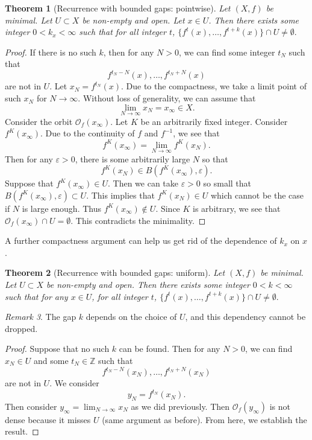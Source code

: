 \documentclass[12pt]{article}
\newtheorem{theorem}{Theorem}[section]
\theoremstyle{definition}
\theoremstyle{remark}
\newtheorem{remark}[theorem]{Remark}
\begin{document}
\begin{theorem}[Recurrence with bounded gaps: pointwise]
Let $(X,f)$ be minimal. Let $U\subset X$ be non-empty and open. Let $x\in U$. Then there exists some integer $0<k_x<\infty$ such that for all integer $t$, $\{f^{t}(x),\dots,f^{t+k}(x)\}\cap U\neq\emptyset.$
\end{theorem}
\begin{proof}
    If there is no such $k$, then for any $N>0$, we can find some integer $t_N$ such that
    \[
    f^{t_N-N}(x),\dots,f^{t_N+N}(x)
    \]
    are not in $U$. Let $x_N=f^{t_N}(x).$ Due to the compactness, we take a limit point of such $x_N$ for $N\to\infty$. Without loss of generality, we can assume that
    \[
    \lim_{N\to\infty} x_N=x_\infty\in X.
    \]
    Consider the orbit $\mathcal{O}_f(x_\infty)$. Let $K$ be an arbitrarily fixed integer. Consider $f^{K}(x_\infty).$ Due to the continuity of $f$ and $f^{-1}$, we see that
    \[
    f^{K}(x_\infty)=\lim_{N\to\infty} f^{K}(x_N).
    \]
    Then for any $\varepsilon>0$, there is some arbitrarily large $N$ so that
    \[
    f^{K}(x_N)\in B(f^{K}(x_\infty),\varepsilon).
    \]
    Suppose that $f^{K}(x_\infty)\in U$. Then we can take $\varepsilon>0$ so small that $B(f^{K}(x_\infty),\varepsilon)\subset U.$ This implies that $f^{K}(x_N)\in U$ which cannot be the case if $N$ is large enough. Thus $f^{K}(x_\infty)\not\in U$. Since $K$ is arbitrary, we see that $\mathcal{O}_f(x_\infty)\cap U=\emptyset$. This contradicts the minimality.
\end{proof}

A further compactness argument can help us get rid of the dependence of $k_x$ on $x$.

\begin{theorem}[Recurrence with bounded gaps: uniform]
Let $(X,f)$ be minimal. Let $U\subset X$ be non-empty and open. Then there exists some integer $0<k<\infty$ such that for any $x\in U$,  for all integer $t$, $\{f^{t}(x),\dots,f^{t+k}(x)\}\cap U\neq\emptyset.$
\end{theorem}
\begin{remark}
The gap $k$ depends on the choice of $U$, and this dependency cannot be dropped.
\end{remark}
\begin{proof}
    Suppose that no such $k$ can be found. Then for any $N>0$, we can find $x_N\in U$ and some $t_N\in \mathbb{Z}$ such that
    \[
    f^{t_N-N}(x_N),\dots,f^{t_N+N}(x_N)
    \]
    are not in $U$. We consider 
    \[
    y_N=f^{t_N}(x_N).
    \]
    Then consider $y_\infty=\lim_{N\to\infty} x_N$ as we did previously. Then $\mathcal{O}_f(y_\infty)$ is not dense because it misses $U$ (same argument as before). From here, we establish the result. 
\end{proof}
\end{document}
